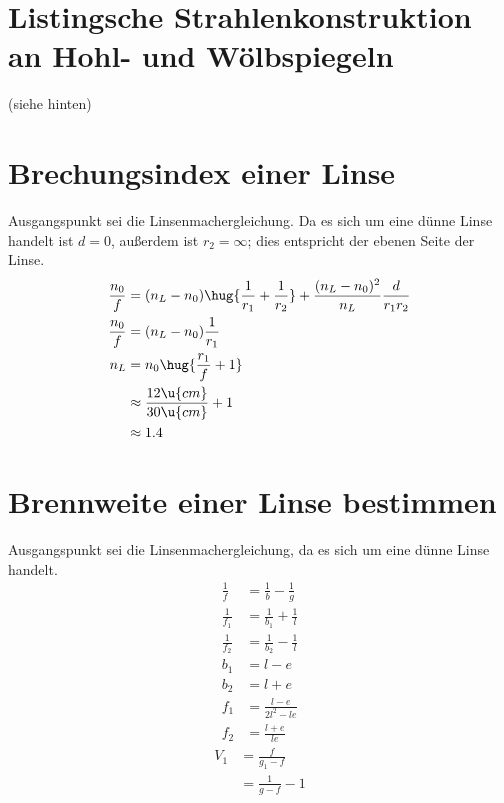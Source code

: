 \documentclass[ex]{exercise}
\begin{document}
\section{Listingsche Strahlenkonstruktion an Hohl- und Wölbspiegeln}
\begin{center}
    (siehe hinten)
\end{center}

\section{Brechungsindex einer Linse}
Ausgangspunkt sei die Linsenmachergleichung. Da es sich um eine dünne Linse handelt
ist \(d=0\), außerdem ist \(r_2=\infty\); dies entspricht der ebenen Seite der Linse.
\begin{align*}
    \frac {n_0}f &= (n_L - n_0)\hug{\frac 1{r_1} + \frac 1{r_2}}
    + \frac{(n_L - n_0)^2}{n_L}\frac{d}{r_1r_2}\\
    \frac {n_0}f &= (n_L - n_0)\frac 1{r_1}\\
    n_L &= n_0\hug{\frac {r_1}f + 1}\\
    &\approx \frac{12 \u{cm}}{30 \u{cm}} + 1\\
    &\approx 1.4
\end{align*}

\section{Brennweite einer Linse bestimmen}
Ausgangspunkt sei die Linsenmachergleichung, da es sich um eine dünne Linse handelt.
\begin{align*}
    \frac{1}{f} &= \frac{1}{b} - \frac{1}{g} \\
    \frac{1}{f_1} &= \frac{1}{b_1} + \frac{1}{l} \\
    \frac{1}{f_2} &= \frac{1}{b_2} - \frac{1}{l} \\
    b_1 &= l - e \\
    b_2 &= l + e \\
    f_1 &= \frac{l - e}{2l^2 - le} \\
    f_2 &= \frac{l + e}{le}        
\end{align*}
\begin{align*}
    V_1 &= \frac{f}{g_1-f}\\
    &= \frac{1}{g-f} - 1\\
\end{align*}
\end{document}
